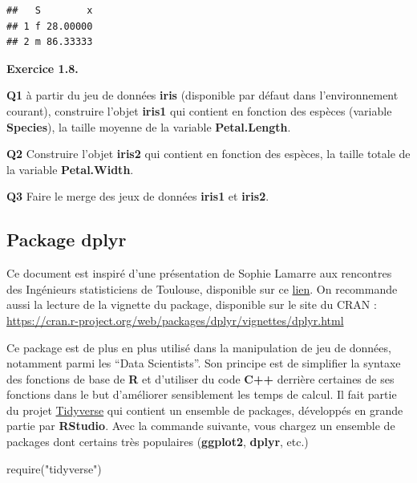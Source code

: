 \documentclass[
]{book}
\newenvironment{Shaded}{\begin{snugshade}}{\end{snugshade}}
\newcommand{\FunctionTok}[1]{\textcolor[rgb]{0.00,0.00,0.00}{#1}}
\newcommand{\NormalTok}[1]{#1}
\newcommand{\StringTok}[1]{\textcolor[rgb]{0.31,0.60,0.02}{#1}}
\theoremstyle{definition}
\theoremstyle{definition}
\theoremstyle{definition}
\theoremstyle{definition}
\theoremstyle{remark}
\begin{document}
\begin{verbatim}
##   S        x
## 1 f 28.00000
## 2 m 86.33333
\end{verbatim}

\textbf{Exercice 1.8.}

\textbf{Q1} à partir du jeu de données \textbf{iris} (disponible par défaut dans l'environnement courant), construire l'objet \textbf{iris1} qui contient en fonction des espèces (variable \textbf{Species}), la taille moyenne de la variable \textbf{Petal.Length}.

\textbf{Q2} Construire l'objet \textbf{iris2} qui contient en fonction des espèces,
la taille totale de la variable \textbf{Petal.Width}.

\textbf{Q3} Faire le merge des jeux de données \textbf{iris1} et \textbf{iris2}.

\hypertarget{package-dplyr}{%
\subsection{\texorpdfstring{Package \textbf{dplyr}}{Package dplyr}}\label{package-dplyr}}

Ce document est inspiré d'une présentation de Sophie Lamarre aux rencontres des Ingénieurs statisticiens de Toulouse, disponible
sur ce \href{http://www.thibault.laurent.free.fr/presentation\%20inge_stat/presentation\%2006-10-15/dplyr_Inge_stats_SL_02102015.pdf}{lien}. On recommande aussi la lecture de la vignette du package, disponible sur le site du CRAN :
\url{https://cran.r-project.org/web/packages/dplyr/vignettes/dplyr.html}

Ce package est de plus en plus utilisé dans la manipulation de jeu de données, notamment parmi les ``Data Scientists''. Son principe est de simplifier la syntaxe des fonctions de base de \textbf{R} et d'utiliser du code \textbf{C++} derrière certaines de ses fonctions dans le but d'améliorer sensiblement les temps de calcul. Il fait partie du projet \href{https://www.tidyverse.org/}{Tidyverse} qui contient un ensemble de packages, développés en grande partie par \textbf{RStudio}. Avec la commande suivante, vous chargez un ensemble de packages dont certains très populaires (\textbf{ggplot2}, \textbf{dplyr}, etc.)

\begin{Shaded}
\begin{Highlighting}[]
\FunctionTok{require}\NormalTok{(}\StringTok{"tidyverse"}\NormalTok{)}
\end{Highlighting}
\end{Shaded}
\end{document}
